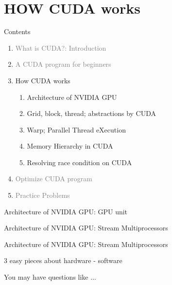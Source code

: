\documentclass[dvipdfmx,11pt]{beamer}   %
\begin{document}
\section{HOW CUDA works}
\begin{frame}{Contents}
  \begin{enumerate}[<+->]   %
    \item \textcolor{gray}{What is CUDA?: Introduction}
    \item \textcolor{gray}{A CUDA program for beginners}
    \item How CUDA works
    \begin{enumerate}
      \item Architecture of NVIDIA GPU
      \item Grid, block, thread; abstractions by CUDA
      \item Warp; Parallel Thread eXecution
      \item Memory Hierarchy in CUDA
      \item Resolving race condition on CUDA
    \end{enumerate}
    \item \textcolor{gray}{Optimize CUDA program}
    \item \textcolor{gray}{Practice Problems}
  \end{enumerate}
\end{frame}
\begin{frame}{Architecture of NVIDIA GPU: GPU unit}

\end{frame}
\begin{frame}{Architecture of NVIDIA GPU: Stream Multiprocessors}

\end{frame}
\begin{frame}{Architecture of NVIDIA GPU: Stream Multiprocessors}

\end{frame}
\begin{frame}{3 easy pieces about hardware - software}

\end{frame}
\begin{frame}{You may have questions like ...}

\end{frame}
\end{document}

